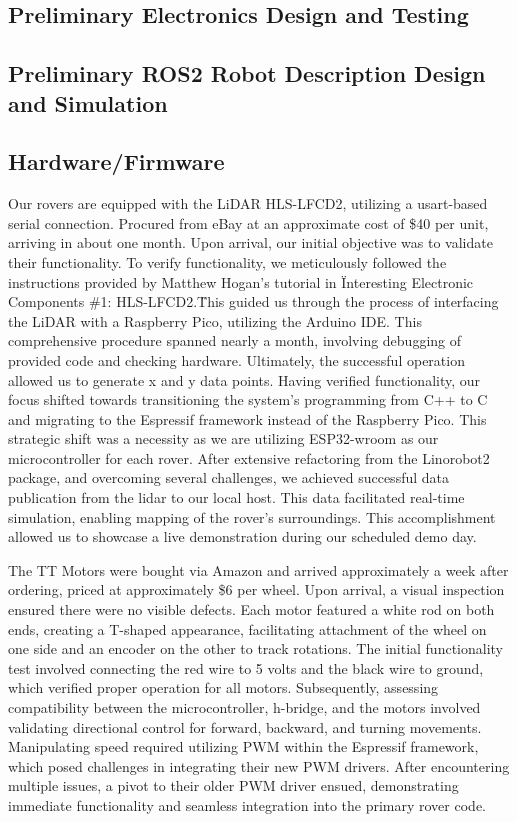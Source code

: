 \documentclass[conference]{IEEEtran}
\begin{document}
\subsection{Preliminary Electronics Design and Testing}



\subsection{Preliminary ROS2 Robot Description Design and Simulation}

\subsection{Hardware/Firmware}

Our rovers are equipped with the LiDAR HLS-LFCD2, utilizing a usart-based serial connection. Procured from eBay at an approximate cost of \$40 per unit, arriving in about one month. Upon arrival, our initial objective was to validate their functionality.
To verify functionality, we meticulously followed the instructions provided by Matthew Hogan's tutorial in \"Interesting Electronic Components \#1: HLS-LFCD2.\" This guided us through the process of interfacing the LiDAR with a Raspberry Pico, utilizing the Arduino IDE. This comprehensive procedure spanned nearly a month, involving debugging of provided code and checking hardware. Ultimately, the successful operation allowed us to generate x and y data points.
Having verified functionality, our focus shifted towards transitioning the system's programming from C++ to C and migrating to the Espressif framework instead of the Raspberry Pico. This strategic shift was a necessity as we are utilizing ESP32-wroom as our microcontroller for each rover.
After extensive refactoring from the Linorobot2 package, and overcoming several challenges, we achieved successful data publication from the lidar to our local host. This data facilitated real-time simulation, enabling mapping of the rover's surroundings. This accomplishment allowed us to showcase a live demonstration during our scheduled demo day.

The TT Motors were bought via Amazon and arrived approximately a week after ordering, priced at approximately \$6 per wheel. Upon arrival, a visual inspection ensured there were no visible defects. Each motor featured a white rod on both ends, creating a T-shaped appearance, facilitating attachment of the wheel on one side and an encoder on the other to track rotations.
The initial functionality test involved connecting the red wire to 5 volts and the black wire to ground, which verified proper operation for all motors. Subsequently, assessing compatibility between the microcontroller, h-bridge, and the motors involved validating directional control for forward, backward, and turning movements. Manipulating speed required utilizing PWM within the Espressif framework, which posed challenges in integrating their new PWM drivers. After encountering multiple issues, a pivot to their older PWM driver ensued, demonstrating immediate functionality and seamless integration into the primary rover code.
\end{document}
